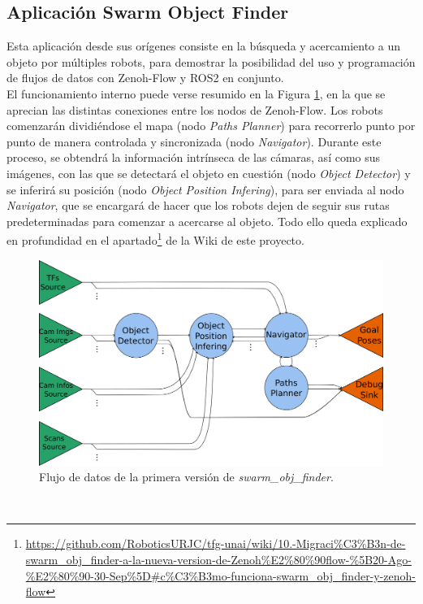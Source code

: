 \subsection{Aplicación Swarm Object Finder}
\label{sec:swarm_obj_finder}

Esta aplicación desde sus orígenes consiste en la búsqueda y acercamiento a un
objeto por múltiples robots, para demostrar la posibilidad del uso y
programación de flujos de datos con Zenoh-Flow y ROS2 en conjunto.
\\

El funcionamiento interno puede verse resumido en la Figura
\ref{fig:data_flow_scheme}, en la que se aprecian las distintas conexiones entre
los nodos de Zenoh-Flow.
Los robots comenzarán dividiéndose el mapa (nodo \textit{Paths Planner}) para
recorrerlo punto por punto de manera controlada y sincronizada (nodo
\textit{Navigator}).
Durante este proceso, se obtendrá la información intrínseca de las cámaras, así
como sus imágenes, con las que se detectará el objeto en cuestión (nodo
\textit{Object Detector}) y se inferirá su posición (nodo \textit{Object
Position Infering}), para ser enviada al nodo \textit{Navigator}, que se
encargará de hacer que los robots dejen de seguir sus rutas predeterminadas para
comenzar a acercarse al objeto.
Todo ello queda explicado en profundidad en el apartado\footnote{
\url{https://github.com/RoboticsURJC/tfg-unai/wiki/10.-Migraci\%C3\%B3n-de-swarm\_obj\_finder-a-la-nueva-version-de-Zenoh\%E2\%80\%90flow-\%5B20-Ago-\%E2\%80\%90-30-Sep\%5D\#c\%C3\%B3mo-funciona-swarm\_obj\_finder-y-zenoh-flow}}
de la Wiki de este proyecto.

\begin{figure} [h!]
  \begin{center}
    \includegraphics[width=12cm]{figs/data_flow_scheme}
  \end{center}
  \caption{Flujo de datos de la primera versión de \textit{swarm\_obj\_finder}.}
  \label{fig:data_flow_scheme}
\end{figure}\


